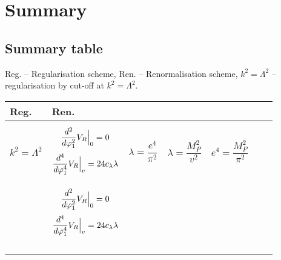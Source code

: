 \chapter{Summary}
\section{Summary table}
Reg. -- Regularisation scheme, Ren. -- Renormalisation scheme, $k^2=\Lambda^2$ -- regularisation 
by cut-off at $k^2=\Lambda^2$.
\newpage
\begin{longtable}[c]{|C{1.5cm}|C{3cm}|C{2cm}|C{2cm}|C{2cm}|C{4cm}|C{4cm}|}
\hline
Reg.&Ren.&&& &&\\
\hline
$k^2 = \Lambda^2$&
\begin{equation*}
{\frac{d^{2}}{d \varphi_1^{2}}V_R\Big|_{0}} = 0
\end{equation*}
\begin{equation*}
{\frac{d^{4}}{d \varphi_1^{4}}V_R\Big|_{v}} = 24c_\lambda\lambda
\end{equation*}&
\begin{equation*}
\lambda=\frac{e^4}{\pi^2}
\end{equation*}&
\begin{equation*}
\lambda=\frac{M_P^2}{v^2}
\end{equation*}& 
\begin{equation*}
e^4=\frac{M_P^2}{\pi^2}
\end{equation*}&&\\
\hline
\parbox[t]{5mm}{}&
\begin{equation*}{\frac{d^{2}}{d \varphi_1^{2}}V_R\Big|_{0}} = 0\end{equation*}\begin{equation*}
{\frac{d^{4}}{d \varphi_1^{4}}V_R\Big|_{v}} = 24c_\lambda\lambda\end{equation*}&&&&&\\
&&&&&&\\
&&&&&&\\
&&&&&&\\
\hline
\end{longtable}

